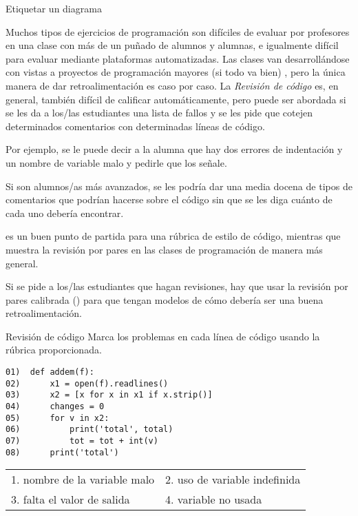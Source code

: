 \begin{aside}{Etiquetar un diagrama}

Muchos tipos de ejercicios de programación son difíciles de evaluar por profesores en una clase con más de un puñado de alumnos y alumnas, e igualmente difícil para evaluar mediante plataformas automatizadas.
Las clases van desarrollándose con vistas a proyectos de programación mayores (si todo va bien) , 
pero la única manera de dar retroalimentación es caso por caso.
La \emph{Revisión de código} es, en general, también  difícil de calificar automáticamente,
pero puede ser abordada si se les da a los/las estudiantes una lista de fallos y se les pide que cotejen determinados comentarios con determinadas líneas de código.

Por ejemplo, 
se le puede decir a la alumna que hay dos errores de indentación y un nombre de variable malo y pedirle que los señale.

Si son alumnos/as más avanzados, se les podría dar una media docena de tipos de comentarios que podrían hacerse sobre el código sin que se les diga cuánto de cada uno debería encontrar.

\cite{Steg2016b} es un buen punto de partida para una rúbrica de estilo de código, mientras que~\cite{Luxt2009} muestra la revisión por pares en las clases de programación de manera más general.

Si se pide a los/las estudiantes que hagan revisiones, hay que usar la revisión por pares calibrada () para que tengan modelos de cómo debería ser una buena retroalimentación.

\begin{aside}{Revisión de código}
 Marca los problemas en cada línea de código usando la rúbrica proporcionada.

\begin{verbatim}
01)  def addem(f):
02)      x1 = open(f).readlines()
03)      x2 = [x for x in x1 if x.strip()]
04)      changes = 0
05)      for v in x2:
06)          print('total', total)
07)          tot = tot + int(v)
08)      print('total')
\end{verbatim}

   \begin{longtable}{ll}
    1. nombre de la variable malo   & 2. uso de variable indefinida \\
    3. falta el valor de salida & 4. variable no usada
  \end{longtable}

\end{aside}


\end{aside}
